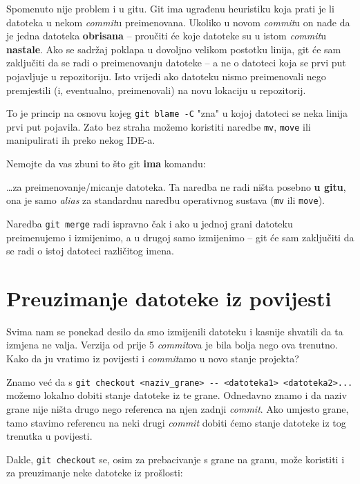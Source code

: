 Spomenuto nije problem i u gitu.
Git ima ugrađenu heuristiku koja prati je li datoteka u nekom \emph{commit}u preimenovana.
Ukoliko u novom \emph{commit}u on nađe da je jedna datoteka \textbf{obrisana} -- proučiti će koje datoteke su u istom \emph{commit}u \textbf{nastale}. 
Ako se sadržaj poklapa u dovoljno velikom postotku linija, git će sam zaključiti da se radi o preimenovanju datoteke -- a ne o datoteci koja se prvi put pojavljuje u repozitoriju.
Isto vrijedi ako datoteku nismo preimenovali nego premjestili (i, eventualno, preimenovali) na novu lokaciju u repozitorij.

To je princip na osnovu kojeg \verb+git blame -C+ "zna" u kojoj datoteci se neka linija prvi put pojavila.
Zato bez straha možemo koristiti naredbe \verb+mv+, \verb+move+ ili manipulirati ih preko nekog IDE-a.

Nemojte da vas zbuni to što git \textbf{ima} komandu:


\dots{}za preimenovanje/micanje datoteka.
Ta naredba ne radi ništa posebno \textbf{u gitu}, ona je samo \emph{alias} za standardnu naredbu operativnog sustava (\verb+mv+ ili \verb+move+).

Naredba \verb+git merge+ radi ispravno čak i ako u jednoj grani datoteku preimenujemo i izmijenimo, a u drugoj samo izmijenimo -- git će sam zaključiti da se radi o istoj datoteci različitog imena.

\section*{Preuzimanje datoteke iz povijesti}

Svima nam se ponekad desilo da smo izmijenili datoteku i kasnije shvatili da ta izmjena ne valja. 
Verzija od prije 5 \emph{commit}ova je bila bolja nego ova trenutno.
Kako da ju vratimo iz povijesti i \emph{commit}amo u novo stanje projekta?

Znamo već da s \verb+git checkout <naziv_grane> -- <datoteka1> <datoteka2>...+ možemo lokalno dobiti stanje datoteke iz te grane.
Odnedavno znamo i da naziv grane nije ništa drugo nego referenca na njen zadnji \emph{commit}.
Ako umjesto grane, tamo stavimo referencu na neki drugi \emph{commit} dobiti ćemo stanje datoteke iz tog trenutka u povijesti.

Dakle, \verb+git checkout+ se, osim za prebacivanje s grane na granu, može koristiti i za preuzimanje neke datoteke iz prošlosti:

